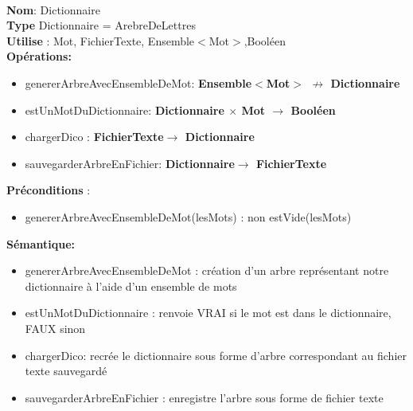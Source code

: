 \documentclass{article}
\begin{document}
    \noindent
    \\
    \textbf{Nom}: Dictionnaire\\
    \textbf{Type} Dictionnaire = ArebreDeLettres \\
    \textbf{Utilise} : Mot, FichierTexte, Ensemble$<$Mot$>$,Booléen\\
    \textbf{Opérations:} \begin{itemize}[label=$\ $, leftmargin=2cm, itemsep=0cm]
        \item genererArbreAvecEnsembleDeMot: \textbf{Ensemble$<$Mot$>$ $\nrightarrow $ Dictionnaire}
        \item estUnMotDuDictionnaire: \textbf{Dictionnaire $\times$ Mot $\rightarrow $ Booléen}
        \item chargerDico : \textbf{FichierTexte$ \rightarrow$ Dictionnaire}
        \item sauvegarderArbreEnFichier: \textbf{Dictionnaire$\rightarrow$ FichierTexte}
        
    \end{itemize}
    \textbf{Préconditions} :
    \begin{itemize}[label=$\ $, leftmargin=2cm, itemsep=0cm]
     \item genererArbreAvecEnsembleDeMot(lesMots) : non estVide(lesMots)
     \end{itemize}

    \textbf{Sémantique: }\begin{itemize}[label=$\- $, leftmargin=2cm, itemsep=0cm]
        \item genererArbreAvecEnsembleDeMot : création d'un arbre représentant notre dictionnaire à l'aide d'un ensemble de mots
        \item estUnMotDuDictionnaire : renvoie VRAI si le mot est dans le dictionnaire, FAUX sinon
        \item chargerDico: recrée le dictionnaire sous forme d'arbre correspondant au fichier texte sauvegardé
        \item sauvegarderArbreEnFichier : enregistre l'arbre sous forme de fichier texte
    \end{itemize}
\end{document}
